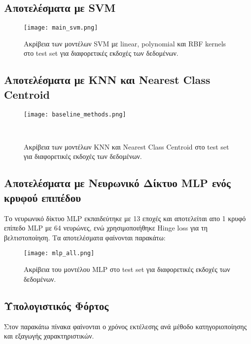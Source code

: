 \documentclass[a4paper,12pt]{article}
\newcommand{\lt}{\latintext}
\newcommand{\gt}{\greektext}
\begin{document}
\subsection{Αποτελέσματα με \lt SVM \gt}


\begin{figure}[H]
    \centering
    \texttt{[image: main\_svm.png]}
    \caption{Ακρίβεια των μοντέλων \lt SVM \gt με \lt linear, polynomial \gt και \lt RBF kernels \gt στο \lt test set \gt για διαφορετικές εκδοχές των δεδομένων.}
    \label{fig:main svm}
\end{figure}

\subsection{Αποτελέσματα με \lt KNN \gt και \lt Nearest Class Centroid \gt}

\begin{figure}[H]
    \centering
    \texttt{[image: baseline\_methods.png]}
    \caption{Ακρίβεια των μοντέλων \lt KNN \gt και \lt Nearest Class Centroid \gt στο \lt test set \gt για διαφορετικές εκδοχές των δεδομένων.}
    \label{fig:knn}\
\end{figure}

\subsection{Αποτελέσματα με Νευρωνικό Δίκτυο \lt MLP \gt ενός κρυφού επιπέδου}

Το νευρωνικό δίκτυο \lt MLP \gt εκπαιδεύτηκε με 13 εποχές και αποτελείται απο 1 κρυφό επίπεδο \lt MLP \gt με 64 νευρώνες, ενώ χρησιμοποιήθηκε Hinge loss για τη βελτιστοποίηση. Τα αποτελέσματα φαίνονται παρακάτω:

\begin{figure}[H]
    \centering
    \texttt{[image: mlp\_all.png]}
    \caption{Ακρίβεια του μοντέλου \lt MLP \gt στο \lt test set \gt για διαφορετικές εκδοχές των δεδομένων.}
    \label{fig:mlp}
\end{figure}

\subsection{Υπολογιστικός Φόρτος}

Στον παρακάτω πίνακα φαίνονται  ο χρόνος εκτέλεσης
ανά μέθοδο κατηγοριοποίησης και εξαγωγής χαρακτηριστικών.  
\end{document}
